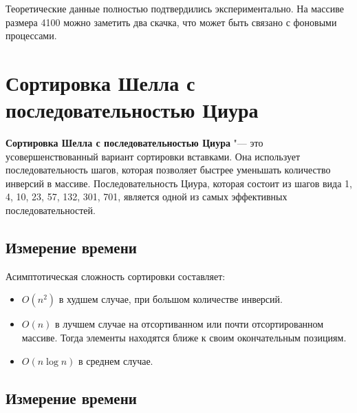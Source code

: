 \documentclass[11pt]{article}
\begin{document}
Теоретические данные полностью подтвердились экспериментально. На массиве размера 4100 можно
заметить два скачка, что может быть связано с фоновыми процессами.

\newpage

\setcounter{section}{12}
\section*{\centering Сортировка Шелла с последовательностью Циура}

\textbf{Сортировка Шелла с последовательностью Циура} "--- это усовершенствованный вариант сортировки вставками.
Она использует последовательность шагов, которая позволяет быстрее уменьшать количество инверсий в массиве. Последовательность Циура,
которая состоит из шагов вида 1, 4, 10, 23, 57, 132, 301, 701, является одной из самых эффективных последовательностей.

\setcounter{subsection}{0}
\subsection{Измерение времени}

\begin{center}
\end{center}
{ \hspace*{\fill} }

\begin{center}
\end{center}
{ \hspace*{\fill} }

Асимптотическая сложность сортировки составляет:
\begin{itemize}
    \item $O(n^2)$ в худшем случае, при большом количестве инверсий.
    \item $O(n)$ в лучшем случае на отсортиванном или почти отсортированном массиве. Тогда элементы находятся ближе к своим окончательным
    позициям.
    \item $O(n\log n)$ в среднем случае.
\end{itemize}

\subsection{Измерение времени}
\end{document}
